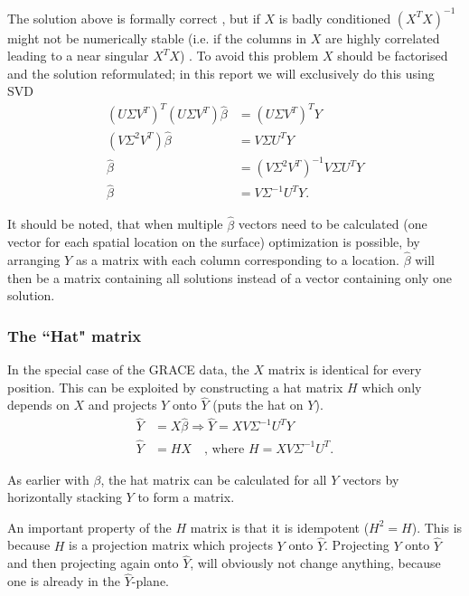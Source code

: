 The solution above is formally correct \cite[p.~12]{statistical-learning}, but if $X$ is badly conditioned $(X^T X)^{-1}$ might not be numerically stable (i.e. if the columns in $X$ are highly correlated leading to a near singular $X^T X$) \cite[p.~8]{aasbjerg-ls}.
To avoid this problem $X$ should be factorised and the solution reformulated; in this report we will exclusively do this using SVD
\begin{equation}
\begin{split}
\left( U \Sigma V^T\right)^T \left(U \Sigma V^T\right) \hat{\beta} &= \left(U \Sigma V^T\right)^T Y \\
\left( V \Sigma^2 V^T \right) \hat{\beta} &= V \Sigma U^T Y \\
\hat{\beta} &= \left( V \Sigma^2 V^T \right)^{-1} V \Sigma U^T Y \\
\hat{\beta} &= V \Sigma^{-1} U^T Y.
\end{split}
\end{equation}

It should be noted, that when multiple $\hat{\beta}$ vectors need to be calculated (one vector for each spatial location on the surface) optimization is possible, by arranging $Y$ as a matrix with each column corresponding to a location.
$\hat{\beta}$ will then be a matrix containing all solutions instead of a vector containing only one solution.

\subsubsection{The ``Hat" matrix}
In the special case of the GRACE data, the $X$ matrix is identical for every position. This can be exploited by constructing a hat matrix $H$ which only depends on $X$ and projects $Y$ onto $\hat{Y}$ (puts the hat on $Y$).
\begin{equation}
\begin{split}
\hat{Y} &= X \hat{\beta} \Rightarrow \hat{Y} = X V \Sigma^{-1} U^T Y \\
\hat{Y} &= H X \quad \text{, where } H = X V \Sigma^{-1} U^T.
\end{split}
\end{equation}

As earlier with $\beta$, the hat matrix can be calculated for all $Y$ vectors by horizontally stacking $Y$ to form a matrix.

An important property of the $H$ matrix is that it is idempotent ($H^2 = H$).
This is because $H$ is a projection matrix which projects $Y$ onto $\hat{Y}$.
Projecting $Y$ onto $\hat{Y}$ and then projecting again onto $\hat{Y}$, will obviously not change anything, because one is already in the $\hat{Y}$-plane.

